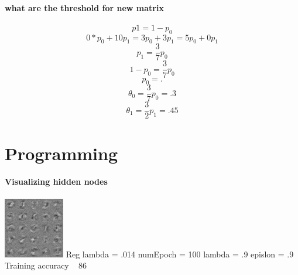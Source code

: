 \documentclass{article}
\begin{document}
\subsection{what are the threshold for new matrix}
$$p1 = 1 - p_0$$
$$ 0*p_0 +10p_1 = 3p_0 + 3p_1 = 5p_0 + 0p_1$$
$$p_1 = \frac{3}{7}p_0 $$
$$1-p_0 = \frac{3}{7}p_0 $$ 
$$p_0 = . $$
$$\theta{_0} = \frac{3}{7}p_0  = .3 $$
$$\theta{_1} = \frac{3}{2}p_1 = .45$$
\part{Programming}
\subsection{Visualizing hidden nodes }

\includegraphics[width = \linewidth]{test1.jpg}
 Reg lambda = .014 
 \linebreak
 numEpoch = 100 
 \linebreak
 lambda = .9 
 \linebreak
 epislon  = .9
 \linebreak
 Training accuracy ~ 86%
\end{document}
